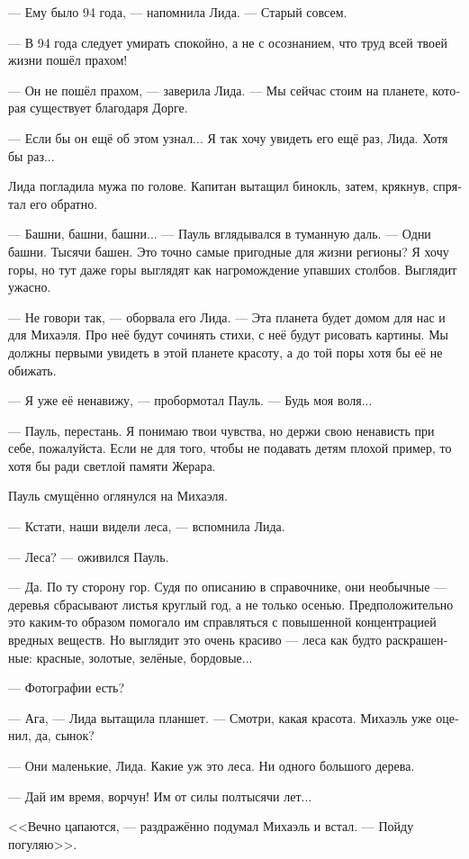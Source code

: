 \documentclass[a4paper,12pt,fleqn]{book}\usepackage{polyglossia}\setdefaultlanguage[babelshorthands=true]{russian}\setotherlanguage{english}\defaultfontfeatures{Ligatures=TeX,Mapping=tex-text}\usepackage{xcolor}\newcommand{\ml}[3]{#2}
\begin{document}
--- Ему было 94 года, --- напомнила Лида.
--- Старый совсем.

--- В 94 года следует умирать спокойно, а не с осознанием, что труд всей твоей жизни пошёл прахом!

--- Он не пошёл прахом, --- заверила Лида.
--- Мы сейчас стоим на планете, которая существует благодаря Дорге.

--- Если бы он ещё об этом узнал...
Я так хочу увидеть его ещё раз, Лида.
Хотя бы раз...

Лида погладила мужа по голове.
Капитан вытащил бинокль, затем, крякнув, спрятал его обратно.

--- Башни, башни, башни... --- Пауль вглядывался в туманную даль.
--- Одни башни.
Тысячи башен.
Это точно самые пригодные для жизни регионы?
Я хочу горы, но тут даже горы выглядят как нагромождение упавших столбов.
Выглядит ужасно.

--- Не говори так, --- оборвала его Лида.
--- Эта планета будет домом для нас и для Михаэля.
Про неё будут сочинять стихи, с неё будут рисовать картины.
Мы должны первыми увидеть в этой планете красоту, а до той поры хотя бы её не обижать.

--- Я уже её ненавижу, --- пробормотал Пауль.
--- Будь моя воля...

--- Пауль, перестань.
Я понимаю твои чувства, но держи свою ненависть при себе, пожалуйста.
Если не для того, чтобы не подавать детям плохой пример, то хотя бы ради светлой памяти Жерара.

Пауль смущённо оглянулся на Михаэля.

--- Кстати, наши видели леса, --- вспомнила Лида.

--- Леса? --- оживился Пауль.

--- Да.
По ту сторону гор.
Судя по описанию в справочнике, они необычные --- деревья сбрасывают листья круглый год, а не только осенью.
Предположительно это каким-то образом помогало им справляться с повышенной концентрацией вредных веществ.
Но выглядит это очень красиво --- леса как будто раскрашенные: красные, золотые, зелёные, бордовые...

--- Фотографии есть?

--- Ага, --- Лида вытащила планшет.
--- Смотри, какая красота.
Михаэль уже оценил, да, сынок?

--- Они маленькие, Лида.
Какие уж это леса.
Ни одного большого дерева.

--- Дай им время, ворчун!
Им от силы полтысячи лет...

<<Вечно цапаются, --- раздражённо подумал Михаэль и встал.
--- Пойду погуляю>>.
\end{document}
